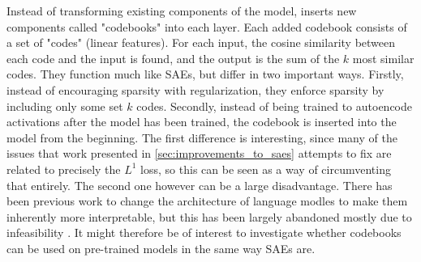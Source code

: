 Instead of transforming existing components of the model, \textcite{tamkin_codebook_2023} inserts new components called "codebooks" into each layer.
Each added codebook consists of a set of "codes" (linear features).
For each input, the cosine similarity between each code and the input is found, and the output is the sum of the $k$ most similar codes. 
They function much like SAEs, but differ in two important ways.
Firstly, instead of encouraging sparsity with regularization, they enforce sparsity by including only some set $k$ codes.
Secondly, instead of being trained to autoencode activations after the model has been trained, the codebook is inserted into the model from the beginning.
The first difference is interesting, since many of the issues that work presented in \ref{sec:improvements_to_saes} attempts to fix are related to precisely the $L^1$ loss, so this can be seen as a way of circumventing that entirely.
The second one however can be a large disadvantage.
There has been previous work \parencite{elhage_softmax_2022} to change the architecture of language modles to make them inherently more interpretable, but this has been largely abandoned mostly due to infeasibility \parencite{bricken_towards_2023}.
It might therefore be of interest to investigate whether codebooks can be used on pre-trained models in the same way SAEs are.
